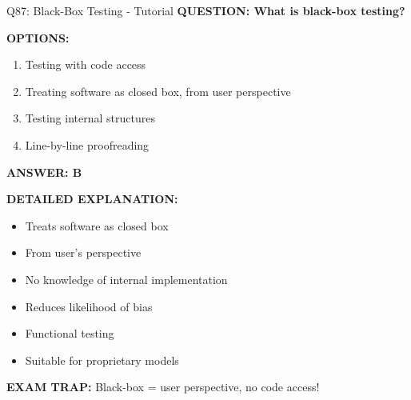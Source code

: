 \documentclass[8pt]{beamer}
\begin{document}
	\begin{frame}{Q87: Black-Box Testing - Tutorial}
		\fontsize{6.5}{7.5}\selectfont
		\textbf{QUESTION: What is black-box testing?}
		
		\vspace{0.1cm}
		\textbf{OPTIONS:}
		\begin{enumerate}
			\item Testing with code access
			\item Treating software as closed box, from user perspective
			\item Testing internal structures
			\item Line-by-line proofreading
		\end{enumerate}
		
		\vspace{0.1cm}
		\textcolor{myblue}{\textbf{ANSWER: B}}
		
		\vspace{0.1cm}
		\textbf{DETAILED EXPLANATION:}
		\begin{itemize}
			\item Treats software as closed box
			\item From user's perspective
			\item No knowledge of internal implementation
			\item Reduces likelihood of bias
			\item Functional testing
			\item Suitable for proprietary models
		\end{itemize}
		
		\vspace{0.1cm}
		\textcolor{myred}{\textbf{EXAM TRAP:}} Black-box = \textcolor{myblue}{user perspective, no code access}!
	\end{frame}
	
\end{document}
